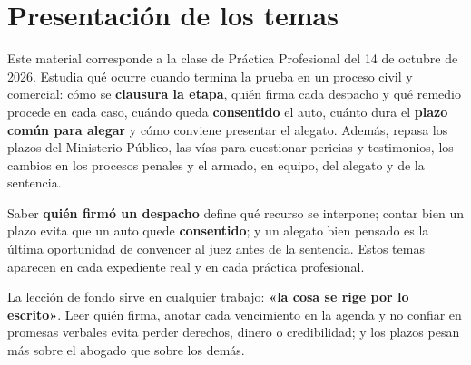 \documentclass[12pt,oneside]{book}
\newcommand{\fechaclase}{14 de octubre de 2026}
\begin{document}
\tableofcontents

\chapter*{Presentación de los temas}

Este material corresponde a la clase de Práctica Profesional del \fechaclase. Estudia qué ocurre cuando termina la prueba en un proceso civil y comercial: cómo se \textbf{clausura la etapa}, quién firma cada despacho y qué remedio procede en cada caso, cuándo queda \textbf{consentido} el auto, cuánto dura el \textbf{plazo común para alegar} y cómo conviene presentar el alegato. Además, repasa los plazos del Ministerio Público, las vías para cuestionar pericias y testimonios, los cambios en los procesos penales y el armado, en equipo, del alegato y de la sentencia.

\begin{important}
Saber \textbf{quién firmó un despacho} define qué recurso se interpone; contar bien un plazo evita que un auto quede \textbf{consentido}; y un alegato bien pensado es la última oportunidad de convencer al juez antes de la sentencia. Estos temas aparecen en cada expediente real y en cada práctica profesional.

La lección de fondo sirve en cualquier trabajo: \textbf{«la cosa se rige por lo escrito»}. Leer quién firma, anotar cada vencimiento en la agenda y no confiar en promesas verbales evita perder derechos, dinero o credibilidad; y los plazos pesan más sobre el abogado que sobre los demás.
\end{important}
\end{document}
